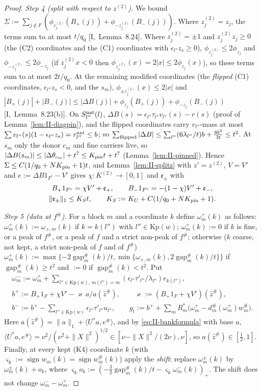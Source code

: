 \documentclass[10pt]{amsart}
\theoremstyle{definition}
\theoremstyle{remark}
\newcommand{\sgn}{\operatorname{sign}}
\newcommand{\gap}{\operatorname{gap}}
\newcommand{\zh}{\hat z}
\newcommand{\ip}[2]{\langle #1,#2\rangle}
\begin{document}
\begin{proof}
\emph{Step 4 (split with respect to $z^{(2)}$).}  We bound
$\Sigma:=\sum_{j\notin F}(\phi_{z^{(2)}_j}(B_+(j))+\phi_{-z^{(2)}_j}(B_-(j)))$.
Where $z^{(2)}_j=z_j$, the terms sum to at most $t/q_0$
[I,~Lemma~8.24].  Where $z^{(2)}_j=\pm1$ and $z^{(2)}_jz_j\ge0$ (the (C2)
coordinates and the (C1) coordinates with $\epsilon_{l''}z_s\ge0$),
$\phi_{z^{(2)}_j}\le2\phi_{z_j}$ and $\phi_{-z^{(2)}_j}\le2\phi_{-z_j}$
(if $z^{(2)}_jx<0$ then $\phi_{z^{(2)}_j}(x)=2|x|\le2\phi_{z_j}(x)$), so these
terms sum to at most $2t/q_0$.  At the remaining modified coordinates (the
\emph{flipped} (C1) coordinates, $\epsilon_{l''}z_s<0$, and the $s_m$),
$\phi_{\pm z^{(2)}_j}(x)\le2|x|$ and $|B_+(j)|+|B_-(j)|\le|\Delta B(j)|+
\phi_{z_j}(B_+(j))+\phi_{-z_j}(B_-(j))$ [I,~Lemma~8.23(b)].  On
$S^{\rm nat}_{l''}(l)$, $\Delta B(s)=\epsilon_{l''}\tau_{l''}v_{l''}(s)-r(s)$
(proof of Lemma~\ref{lem:II-diagpin}), and the flipped coordinates carry
$v_{l''}$-mass at most $\sum v_{l''}(s)(1-\epsilon_{l''}z_s)=r^{\rm nat}_{l''}\le
b$; so $\sum_{\rm flipped}|\Delta B|\le\sum_{l''}(6\lambda_{l''}/t)b+
\frac{8b^2}{3t}\le t^2$.  At $s_m$ only the donor $c_m$ and fine carriers
live, so $|\Delta B(s_m)|\le|\Delta\theta_{c_m}|+t^7\le K_{\rm pin}t+t^7$
(Lemma~\ref{lem:II-pinned}).  Hence $\Sigma\le C(1/q_0+NK_{\rm pin}+1)t$, and
Lemma~\ref{lem:II-splitz} with $z'=z^{(2)}$, $V=V'$ and $e:=\Delta B
1_{F^c}-V'$ gives $\chi:K^{(2)}\to[0,1]$ and $\mathfrak e_\pm$ with
\begin{gather*}
 B_+1_{F^c}=\chi V'+\mathfrak e_+,\qquad B_-1_{F^c}=-(1-\chi)V'+\mathfrak e_-,\\
 \|\mathfrak e_\pm\|_1\le K_St,\qquad K_S:=K_U+C(1/q_0+NK_{\rm pin}+1) .
\end{gather*}

\emph{Step 5 (data at $f^\#$).}  For a block $m$ and a coordinate $k$
define $\omega^+_m(k)$ as follows: $\omega^+_m(k):=\omega_{+,m}(k)$ if
$k=k(l'')$ with $l''\in\mathrm{Kp}(w)$; $\omega^+_m(k):=0$ if $k$ is fine, or
a peak of $f^\#$, or a peak of $f$ and a strict non-peak of $f^\#$;
otherwise ($k$ coarse, not kept, a strict non-peak of $f$ and of $f^\#$)
$\omega^+_m(k):=\max\{-2\gap^\#_m(k)/t,\min\{\omega_{+,m}(k),2\gap^\#_m(k)/t\}\}$
if $\gap^\#_m(k)\ge t^2$ and $:=0$ if $\gap^\#_m(k)<t^2$.  Put
\begin{gather*}
 \omega^-_m:=\omega^+_m+\sum_{l''\in\mathrm{Kp}(w),\,m(l'')=m}
 (\epsilon_{l''}\tau'_{l''}/\lambda_{l''})e_{k(l'')},\\
 b^+:=B_+1_F+\chi V'-\varkappa\,a/a(\zh^\#),\qquad
 \varkappa:=(B_+1_F+\chi V')(\zh^\#),\\
 b^-:=b^+-\sum_{l''\in\mathrm{Kp}(w)}\epsilon_{l''}\tau'_{l''}u_{l''},\qquad
 g_t:=b^++\sum_mR_m^*\big(\omega^+_m-d^\#_m(\omega^+_m)w^\#_m\big).
\end{gather*}
Here $a(\zh^\#)=\|a\|_1+\ip{U^*a}{e^\#}$, and by
\eqref{eq:II-bankformula} with base $a$, $\ip{U^*a}{e^\#}=\nu^2/(\nu^2+
\|X\|^2)^{1/2}\in[\nu-\|X\|^2/(2\nu),\nu]$, so $a(\zh^\#)\in[\frac12,1]$.
Finally, at every kept (K4) coordinate $k$ (with $\varsigma_k:=\sgn
w_m(k)=\sgn w^\#_m(k)$) apply the \emph{shift}: replace $\omega^\pm_m(k)$ by
$\omega^\pm_m(k)+o_k$, where $\varsigma_ko_k:=(-\frac32\gap^\#_m(k)/t-
\varsigma_k\omega^-_m(k))_+$.  The shift does not change $\omega^-_m-
\omega^+_m$.


\end{proof}
\end{document}

